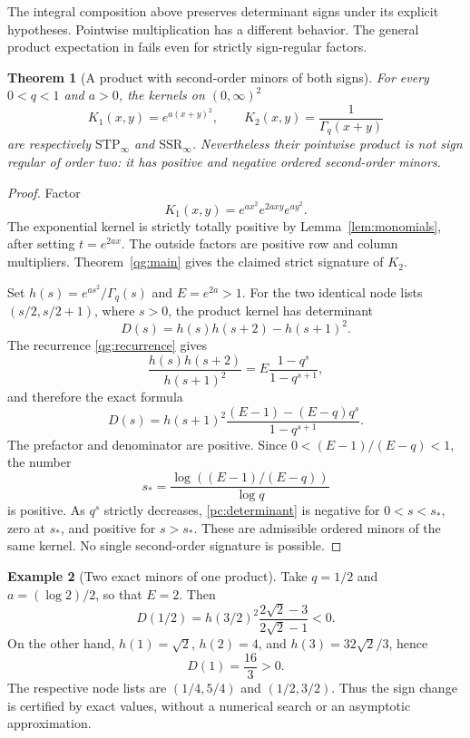 \documentclass[11pt,a4paper]{article}
\newtheorem{theorem}{Theorem}[section]
\theoremstyle{definition}
\newtheorem{example}[theorem]{Example}
\theoremstyle{remark}
\newcommand{\SSR}{\mathrm{SSR}}
\newcommand{\STP}{\mathrm{STP}}
\begin{document}
The integral composition above preserves determinant signs under its
explicit hypotheses. Pointwise multiplication has a different behavior.
The general product expectation in \cite[Section~3, Example~11]{KVZ}
fails even for strictly sign-regular factors.

\begin{theorem}[A product with second-order minors of both signs]
\label{pc:counterexample}
For every \(0<q<1\) and \(a>0\), the kernels on \((0,\infty)^2\)
\[
 K_1(x,y)=e^{a(x+y)^2},\qquad
 K_2(x,y)=\frac1{\Gamma_q(x+y)}
\]
are respectively \(\STP_\infty\) and \(\SSR_\infty\).
Nevertheless their pointwise product is not sign regular of order two:
it has positive and negative ordered second-order minors.
\end{theorem}

\begin{proof}
Factor
\[
 K_1(x,y)=e^{ax^2}e^{2axy}e^{ay^2}.
\]
The exponential kernel is strictly totally positive by
Lemma~\ref{lem:monomials}, after setting \(t=e^{2ax}\).
The outside factors are positive row and column multipliers.
Theorem~\ref{qg:main} gives the claimed strict signature of \(K_2\).

Set \(h(s)=e^{as^2}/\Gamma_q(s)\) and \(E=e^{2a}>1\).
For the two identical node lists
\((s/2,s/2+1)\), where \(s>0\), the product kernel has determinant
\[
 D(s)=h(s)h(s+2)-h(s+1)^2.
\]
The recurrence \eqref{qg:recurrence} gives
\[
 \frac{h(s)h(s+2)}{h(s+1)^2}
 =E\frac{1-q^s}{1-q^{s+1}},
\]
and therefore the exact formula
\begin{equation}\label{pc:determinant}
 D(s)=h(s+1)^2
 \frac{(E-1)-(E-q)q^s}{1-q^{s+1}}.
\end{equation}
The prefactor and denominator are positive. Since
\(0<(E-1)/(E-q)<1\), the number
\begin{equation}\label{pc:threshold}
 s_* =\frac{\log((E-1)/(E-q))}{\log q}
\end{equation}
is positive. As \(q^s\) strictly decreases, \eqref{pc:determinant}
is negative for \(0<s<s_*\), zero at \(s_*\), and positive for
\(s>s_*\). These are admissible ordered minors of the same kernel.
No single second-order signature is possible.
\end{proof}

\begin{example}[Two exact minors of one product]
Take \(q=1/2\) and \(a=(\log2)/2\), so that \(E=2\).
Then
\[
 D(1/2)=h(3/2)^2\frac{2\sqrt2-3}{2\sqrt2-1}<0.
\]
On the other hand, \(h(1)=\sqrt2\), \(h(2)=4\), and
\(h(3)=32\sqrt2/3\), hence
\[
 D(1)=\frac{16}{3}>0.
\]
The respective node lists are \((1/4,5/4)\) and \((1/2,3/2)\).
Thus the sign change is certified by exact values, without a numerical
search or an asymptotic approximation.
\end{example}
\end{document}
